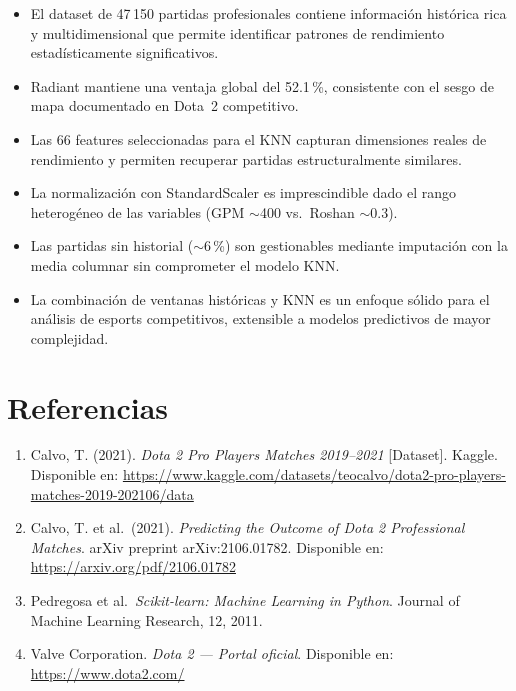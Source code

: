 \documentclass[12pt,a4paper]{article}
\begin{document}
\begin{itemize}
  \item El dataset de 47\,150 partidas profesionales contiene informaci\'on
        hist\'orica rica y multidimensional que permite identificar patrones de
        rendimiento estad\'isticamente significativos.
  \item Radiant mantiene una ventaja global del 52.1\,\%, consistente con el sesgo
        de mapa documentado en Dota~2 competitivo.
  \item Las 66 features seleccionadas para el KNN capturan dimensiones reales de
        rendimiento y permiten recuperar partidas estructuralmente similares.
  \item La normalizaci\'on con StandardScaler es imprescindible dado el rango
        heterog\'eneo de las variables (GPM $\sim$400 vs.\ Roshan $\sim$0.3).
  \item Las partidas sin historial ($\sim$6\,\%) son gestionables mediante
        imputaci\'on con la media columnar sin comprometer el modelo KNN.
  \item La combinaci\'on de ventanas hist\'oricas y KNN es un enfoque s\'olido para
        el an\'alisis de esports competitivos, extensible a modelos predictivos
        de mayor complejidad.
\end{itemize}

\newpage
\section*{Referencias}

\begin{enumerate}
  \item\label{ref:kaggle} Calvo, T. (2021). \textit{Dota 2 Pro Players Matches
        2019--2021} [Dataset]. Kaggle.
        Disponible en: \url{https://www.kaggle.com/datasets/teocalvo/dota2-pro-players-matches-2019-202106/data}
  \item\label{ref:paper} Calvo, T. et al.\ (2021). \textit{Predicting the Outcome
        of Dota 2 Professional Matches}. arXiv preprint arXiv:2106.01782.
        Disponible en: \url{https://arxiv.org/pdf/2106.01782}
  \item\label{ref:sklearn} Pedregosa et al.\ \textit{Scikit-learn: Machine
        Learning in Python}. Journal of Machine Learning Research, 12, 2011.
  \item\label{ref:valve} Valve Corporation. \textit{Dota 2 --- Portal oficial}.
        Disponible en: \url{https://www.dota2.com/}
\end{enumerate}
\end{document}
